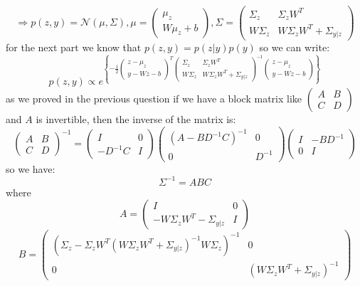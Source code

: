 \begin{qsolve}
\begin{qsolve}[]
		$$\Rightarrow p(z,y) = \mathcal{N}(\mu , \Sigma) , \mu = \begin{pmatrix}\mu_z \\ W\mu_z+b\end{pmatrix} , \Sigma = \begin{pmatrix}\Sigma_z & \Sigma_zW^T \\ W\Sigma_z & W\Sigma_zW^T + \Sigma_{y|z}\end{pmatrix}$$
		for the next part we know that $p(z,y) = p(z|y)p(y)$ so we can write:
		$$p(z,y) \propto e^{\left\{-\frac{1}{2} \begin{pmatrix}
			z - \mu_z \\ y - Wz - b
		\end{pmatrix} ^T \begin{pmatrix}
			\Sigma_z & \Sigma_zW^T \\ W\Sigma_z & W\Sigma_zW^T + \Sigma_{y|z}
		\end{pmatrix}^{-1} \begin{pmatrix}
			z - \mu_z \\ y - Wz - b
		\end{pmatrix}\right\}}$$
		as we proved in the previous question if we have a block matrix like $\begin{pmatrix} A & B \\ C & D \end{pmatrix}$ and $A$ is invertible, then the inverse of the matrix is:
		$$\begin{pmatrix} A & B \\ C & D \end{pmatrix}^{-1} = \begin{pmatrix} I & 0 \\ -D^{-1}C & I \end{pmatrix} \begin{pmatrix} (A-BD^{-1}C)^{-1} & 0 \\ 0 & D^{-1} \end{pmatrix}  \begin{pmatrix} I & -BD^{-1} \\ 0 & I \end{pmatrix}$$
		so we have:
		$$\Sigma^{-1} =ABC$$
		where
		$$ A = \begin{pmatrix} I & 0 \\ -W\Sigma_zW^T - \Sigma_{y|z} & I \end{pmatrix}$$
		$$ B = \begin{pmatrix} (\Sigma_z - \Sigma_zW^T(W\Sigma_zW^T + \Sigma_{y|z})^{-1}W\Sigma_z)^{-1} & 0 \\ 0 & (W\Sigma_zW^T + \Sigma_{y|z})^{-1} \end{pmatrix}$$

\end{qsolve}
\end{qsolve}
